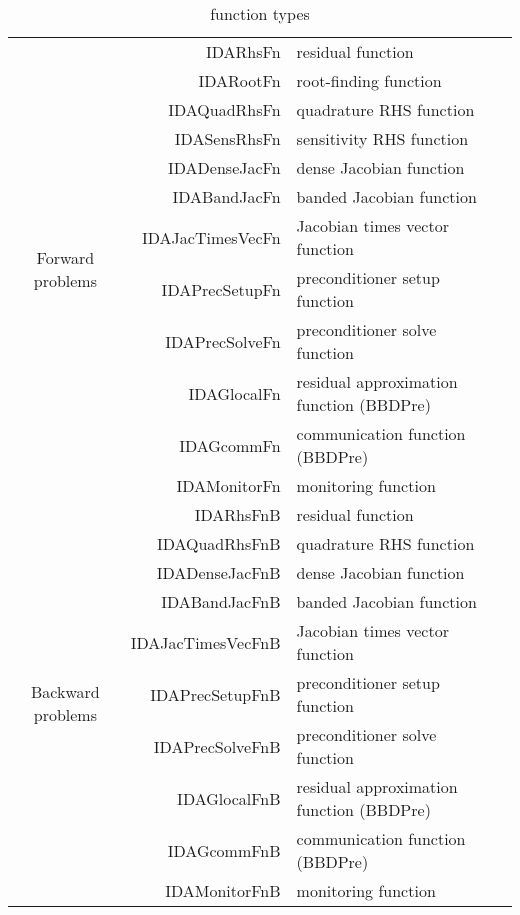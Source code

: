 \begin{table}[h]
\centering
\caption{{\idas} {\matlab} function types}
\label{t:idas_fct_types}
\medskip
\begin{tabular}{|c||r|l|r|}
  \hline
  \multirow{12}{*}{\begin{sideways} Forward problems \end{sideways}}
  &  IDARhsFn         &  residual function & \pageref{p:IDARhsFn} \\
  &  IDARootFn        &  root-finding function  & \pageref{p:IDARootFn} \\
  &  IDAQuadRhsFn     &  quadrature RHS function & \pageref{p:IDAQuadRhsFn} \\
  &  IDASensRhsFn     &  sensitivity RHS function & \pageref{p:IDASensRhsFn} \\
  &  IDADenseJacFn    &  dense Jacobian function & \pageref{p:IDADenseJacFn} \\
  &  IDABandJacFn     &  banded Jacobian function & \pageref{p:IDABandJacFn} \\
  &  IDAJacTimesVecFn &  Jacobian times vector function & \pageref{p:IDAJacTimesVecFn} \\
  &  IDAPrecSetupFn   &  preconditioner setup function & \pageref{p:IDAPrecSetupFn} \\
  &  IDAPrecSolveFn   &  preconditioner solve function & \pageref{p:IDAPrecSolveFn} \\
  &  IDAGlocalFn      &  residual approximation function (BBDPre) & \pageref{p:IDAGlocalFn} \\
  &  IDAGcommFn       &  communication function (BBDPre) & \pageref{p:IDAGcommFn} \\
  &  IDAMonitorFn     &  monitoring function & \pageref{p:IDAMonitorFn} \\
  \hline
  \multirow{10}{*}{\begin{sideways} Backward problems \end{sideways}}
  &  IDARhsFnB        &  residual function & \pageref{p:IDARhsFnB} \\
  &  IDAQuadRhsFnB    &  quadrature RHS function & \pageref{p:IDAQuadRhsFnB} \\
  &  IDADenseJacFnB   &  dense Jacobian function & \pageref{p:IDADenseJacFnB} \\
  &  IDABandJacFnB    &  banded Jacobian function & \pageref{p:IDABandJacFnB} \\
  &  IDAJacTimesVecFnB&  Jacobian times vector function & \pageref{p:IDAJacTimesVecFnB} \\
  &  IDAPrecSetupFnB  &  preconditioner setup function & \pageref{p:IDAPrecSetupFnB} \\
  &  IDAPrecSolveFnB  &  preconditioner solve function & \pageref{p:IDAPrecSolveFnB} \\
  &  IDAGlocalFnB     &  residual approximation function (BBDPre) & \pageref{p:IDAGlocalFnB} \\
  &  IDAGcommFnB      &  communication function (BBDPre) & \pageref{p:IDAGcommFnB} \\
  &  IDAMonitorFnB    &  monitoring function & \pageref{p:IDAMonitorFnB} \\
 \hline
\end{tabular}
\end{table}
